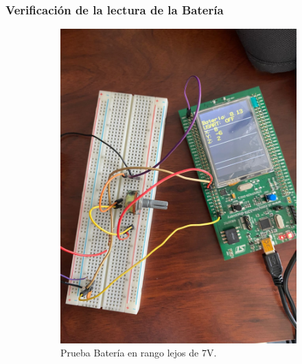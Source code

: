 \subsubsection{Verificación de la lectura de la Batería}

    \begin{figure}[H]
        \begin{subfigure}{0.5\textwidth}
        \centering
        \includegraphics[width=\textwidth]{Imagenes/Prueba_Bat.jpg} 
        \caption{Prueba Batería en rango lejos de 7V.}
        \label{Fig:Prueba_Bat}
    \end{subfigure}
    \begin{subfigure}{0.5\textwidth}
        \centering

\end{subfigure}
\end{figure}
